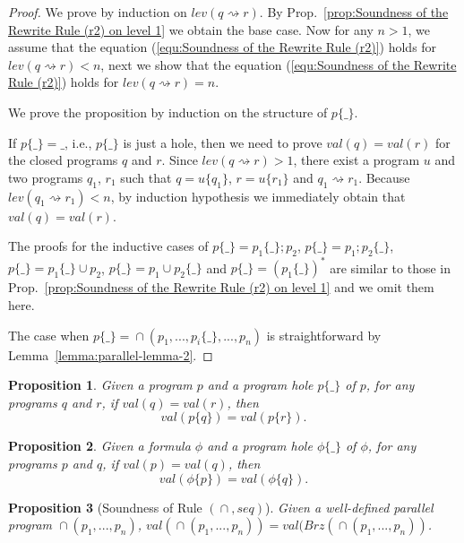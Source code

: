 \documentclass{fcs}
\newtheorem{prop}{Proposition}[section]
\newcommand{\val}[0]{\mathit{val}}
\DeclareMathOperator{\seq}{;}
\DeclareMathOperator{\para}{\cap}
\newcommand{\place}[0]{\_}
\newcommand{\red}[0]{\rightsquigarrow}
\newcommand{\ToSeq}[0]{\mathit{Brz}}
\newcommand{\lev}[0]{\mathit{lev}}
\begin{document}
\begin{proof}
    We prove by induction on $\lev(q\red r)$.
    By Prop.~\ref{prop:Soundness of the Rewrite Rule (r2) on level 1} we obtain the base case.
    Now for any $n>1$, we assume that the equation (\ref{equ:Soundness of the Rewrite Rule (r2)}) holds for $\lev(q\red r) < n$,
    next we show that the equation (\ref{equ:Soundness of the Rewrite Rule (r2)}) holds for $\lev(q\red r) = n$.

    We prove the proposition by induction on the structure of $p\{\place\}$.

    If $p\{\place\} = \place$, i.e., $p\{\place\}$ is just a hole, then we need to prove $\val(q) = \val(r)$ for the closed programs $q$ and $r$.
    Since $\lev(q\red r) > 1$, there exist a program $u$ and two programs $q_1$, $r_1$ such that $q = u\{q_1\}$, $r = u\{r_1\}$ and $q_1\red r_1$.
    Because $\lev(q_1\red r_1) < n$, by induction hypothesis we immediately obtain that $\val(q) = \val(r)$.

    The proofs for the inductive cases of $p\{\place\} = p_1\{\place\}\seq p_2$, $p\{\place\} = p_1\seq p_2\{\place\}$, $p\{\place\} = p_1\{\place\}\cup p_2$, $p\{\place\} = p_1\cup p_2\{\place\}$ and $p\{\place\} = (p_1\{\place\})^*$
    are similar to those in Prop.~\ref{prop:Soundness of the Rewrite Rule (r2) on level 1} and we omit them here.

    The case when $p\{\place\} = \para(p_1,...,p_i\{\place\},...,p_n)$ is straightforward by Lemma~\ref{lemma:parallel-lemma-2}.


\end{proof}

\ifx
\begin{prop}
Given a program $p$ and a program hole $p\{\place\}$ of $p$, for any programs $q$ and $r$, if $\val(q) = \val(r)$, then
$$\val(p\{q\}) = \val(p\{r\}).$$
\end{prop}

\begin{prop}
Given a formula $\phi$ and a program hole $\phi\{\place\}$ of $\phi$, for any programs $p$ and $q$, if $\val(p) = \val(q)$, then
$$\val(\phi\{p\}) = \val(\phi\{q\}).$$
\end{prop}
\fi

\begin{prop}[Soundness of Rule $(\para, \mathit{seq})$]
    \label{prop:Soundness of the Rewrite Rule of (para, seq)}
    Given a well-defined parallel program $\para(p_1,...,p_n)$,
    $\val(\para(p_1,...,p_n)) = \val(\ToSeq(\para(p_1,...,p_n))$.
\end{prop}
\end{document}
